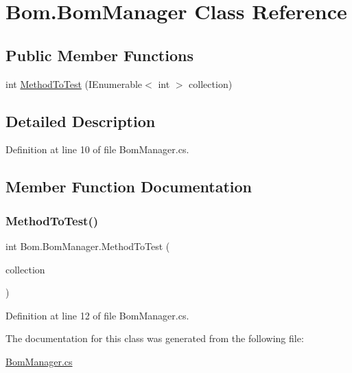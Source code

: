 \hypertarget{class_bom_1_1_bom_manager}{}\section{Bom.\+Bom\+Manager Class Reference}
\label{class_bom_1_1_bom_manager}
\subsection*{Public Member Functions}
\begin{DoxyCompactItemize}
\item 
int \mbox{\hyperlink{class_bom_1_1_bom_manager_a8264943563518a5a9094e8162958b9ab}{Method\+To\+Test}} (I\+Enumerable$<$ int $>$ collection)
\end{DoxyCompactItemize}


\subsection{Detailed Description}


Definition at line 10 of file Bom\+Manager.\+cs.



\subsection{Member Function Documentation}
\mbox{\label{class_bom_1_1_bom_manager_a8264943563518a5a9094e8162958b9ab}} 
\subsubsection{\texorpdfstring{Method\+To\+Test()}{MethodToTest()}}
{\footnotesize\ttfamily int Bom.\+Bom\+Manager.\+Method\+To\+Test (\begin{DoxyParamCaption}\item[{I\+Enumerable$<$ int $>$}]{collection }\end{DoxyParamCaption})\hspace{0.3cm}{\ttfamily [inline]}}



Definition at line 12 of file Bom\+Manager.\+cs.



The documentation for this class was generated from the following file\+:\begin{DoxyCompactItemize}
\item 
\mbox{\hyperlink{_bom_manager_8cs}{Bom\+Manager.\+cs}}\end{DoxyCompactItemize}
